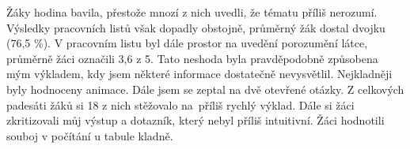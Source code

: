 {Žáky hodina bavila, přestože mnozí z nich uvedli, že tématu příliš nerozumí. Výsledky pracovních listů však dopadly obstojně, průměrný žák dostal dvojku (76,5 \%). V pracovním listu byl dále prostor na uvedění porozumění látce, průměrně žáci označili 3,6 z 5. Tato neshoda byla pravděpodobně způsobena mým výkladem, kdy jsem některé informace dostatečně nevysvětlil. Nejkladněji byly hodnoceny animace.}\odst
{Dále jsem se zeptal na dvě otevřené otázky. Z celkových padesáti žáků si 18 z nich stěžovalo na~příliš rychlý výklad. Dále si žáci zkritizovali můj výstup a dotazník, který nebyl příliš intuitivní. Žáci hodnotili souboj v počítání u tabule kladně.}\odst